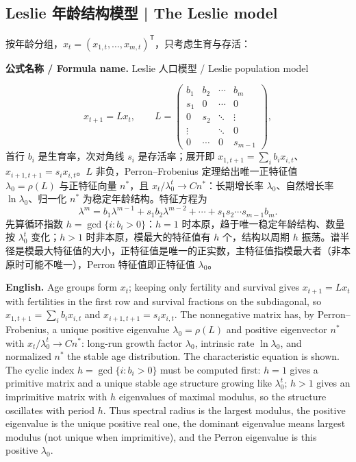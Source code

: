 \documentclass[UTF8,11pt,a4paper]{ctexart}
\newcommand{\EN}[1]{\par\noindent\textbf{English.} #1\par}
\newcommand{\FORMULA}[2]{\par\noindent\textbf{公式名称 / Formula name.} #1 / #2\par}
\begin{document}
\subsection{Leslie 年龄结构模型 | The Leslie model}
按年龄分组，$x_t=(x_{1,t},\ldots,x_{m,t})^{\mathsf T}$，只考虑生育与存活：
\FORMULA{Leslie 人口模型}{Leslie population model}
\[
x_{t+1}=Lx_t,\qquad
L=\begin{pmatrix}
b_1&b_2&\cdots&b_{m}\\
s_1&0&\cdots&0\\
0&s_2&\ddots&\vdots\\
\vdots&&\ddots&0\\
0&\cdots&0&s_{m-1}
\end{pmatrix},
\]
首行 $b_i$ 是生育率，次对角线 $s_i$ 是存活率；展开即 $x_{1,t+1}=\sum_ib_ix_{i,t}$、$x_{i+1,t+1}=s_ix_{i,t}$。$L$ 非负，Perron--Frobenius 定理给出唯一正特征值 $\lambda_0=\rho(L)$ 与正特征向量 $n^*$，且 $x_t/\lambda_0^t\to Cn^*$：长期增长率 $\lambda_0$、自然增长率 $\ln\lambda_0$、归一化 $n^*$ 为稳定年龄结构。特征方程为
\[
\lambda^{m}=b_1\lambda^{m-1}+s_1b_2\lambda^{m-2}+\cdots+s_1s_2\cdots s_{m-1}b_m .
\]
先算循环指数 $h=\gcd\{i:b_i>0\}$：$h=1$ 时本原，趋于唯一稳定年龄结构、数量按 $\lambda_0^t$ 变化；$h>1$ 时非本原，模最大的特征值有 $h$ 个，结构以周期 $h$ 振荡。谱半径是模最大特征值的大小，正特征值是唯一的正实数，主特征值指模最大者（非本原时可能不唯一），Perron 特征值即正特征值 $\lambda_0$。
\EN{Age groups form $x_t$; keeping only fertility and survival gives $x_{t+1}=Lx_t$ with fertilities in the first row and survival fractions on the subdiagonal, so $x_{1,t+1}=\sum_ib_ix_{i,t}$ and $x_{i+1,t+1}=s_ix_{i,t}$. The nonnegative matrix has, by Perron--Frobenius, a unique positive eigenvalue $\lambda_0=\rho(L)$ and positive eigenvector $n^*$ with $x_t/\lambda_0^t\to Cn^*$: long-run growth factor $\lambda_0$, intrinsic rate $\ln\lambda_0$, and normalized $n^*$ the stable age distribution. The characteristic equation is shown. The cyclic index $h=\gcd\{i:b_i>0\}$ must be computed first: $h=1$ gives a primitive matrix and a unique stable age structure growing like $\lambda_0^t$; $h>1$ gives an imprimitive matrix with $h$ eigenvalues of maximal modulus, so the structure oscillates with period $h$. Thus spectral radius is the largest modulus, the positive eigenvalue is the unique positive real one, the dominant eigenvalue means largest modulus (not unique when imprimitive), and the Perron eigenvalue is this positive $\lambda_0$.}
\end{document}
